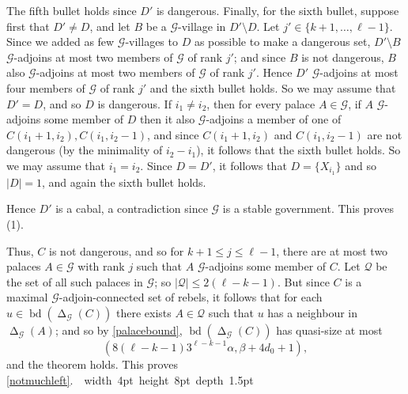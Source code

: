 \documentclass[10pt,a4paper]{amsart}
\theoremstyle{plain}
\newcommand\blackslug{\hbox{\hskip 1pt \vrule width 4pt height 8pt depth 1.5pt \hskip 1pt}}
\newcommand\bbox{\hfill \quad \blackslug \bigbreak}
\def\LL{,\ldots,}
\newcommand{\voro}{\operatorname{\Delta}}
\newcommand{\bd}{\operatorname{bd}}
\newcommand{\mac}{\mathcal}
\def\LL{,\ldots,}
\newcommand{\bd}{\operatorname{bd}}
\newcommand{\mac}{\mathcal}
\newcommand{\voro}{\operatorname{\Delta}}
\begin{document}
	The fifth bullet holds since $D'$ is dangerous. Finally, for the sixth bullet, 
	suppose first that $D'\ne D$, and let $B$ be a $\mac G$-village in $D'\setminus D$. Let $j'\in \{k+1\LL \ell-1\}$.
	Since we added as few $\mac G$-villages to $D$ as possible to make a dangerous set, $D'\setminus B$ $\mac G$-adjoins at most two  members of $\mac G$ of rank $j'$; and since
	$B$ is not dangerous, $B$ also $\mac G$-adjoins at most two  members of $\mac G$ of rank $j'$. Hence $D'$ $\mac G$-adjoins at most four 
	members of $\mac G$ of rank $j'$ and the sixth bullet holds. So we may assume that $D'=D$, and so $D$ is dangerous.
	If $i_1\ne i_2$, then for every palace $A\in \mac G$, if $A$ $\mac G$-adjoins some member
	of $D$
	then it also $\mac G$-adjoins a member of one of $C(i_1+1,i_2),C(i_1,i_2-1)$, and since $C(i_1+1,i_2)$ and $C(i_1,i_2-1)$ are not dangerous (by the minimality of $i_2-i_1$), it follows that
	the sixth bullet holds. So we may assume that $i_1=i_2$. Since $D=D'$, it follows that $D=\{X_{i_1}\}$ and so $|D|=1$, and again the sixth bullet holds.
	
	Hence $D'$ is a cabal, a contradiction since $\mac G$ is a stable government.
	This proves (1).
	
	\bigskip
	
	Thus, $C$ is not dangerous, and so 
	for $k+1\le j\le \ell-1$, there are at most two palaces $A\in \mac G$ with rank $j$ such that $A$ $\mac G$-adjoins some member of $C$.
	Let $\mac Q$ be the set of all such palaces in $\mac G$; so $|\mac Q|\le 2(\ell-k-1)$. But since $C$ is a maximal
	$\mac G$-adjoin-connected set of rebels, it follows that for each $u\in \bd(\voro_{\mac G}(C))$ there exists $A\in \mac Q$ such that $u$ has a neighbour in $\voro_{\mac G}(A)$;
	and so by \ref{palacebound}, $\bd(\voro_{\mac G}(C))$ has quasi-size at most
	$$\left(8(\ell-k-1) 3^{\ell-k-1}\alpha, \beta+4d_0+1\right),$$
	and the theorem holds.
	This proves \ref{notmuchleft}.~\bbox
\end{document}
